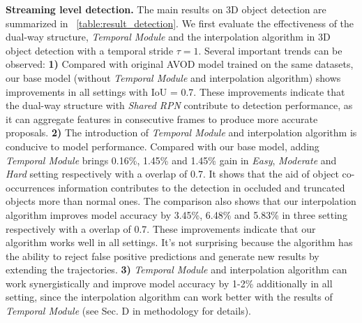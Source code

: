 \documentclass[letterpaper, 10pt, conference]{ieeeconf}  %
\begin{document}
\textbf{Streaming level detection.} The main results on 3D object detection are summarized in \tablename \, \ref{table:result_detection}. We first evaluate the effectiveness of the dual-way structure, \textit{Temporal Module} and the interpolation algorithm in 3D object detection with a temporal stride $\tau = 1$. Several important trends can be observed: \textbf{1)} Compared with original AVOD \cite{ku2018joint} model trained on the same datasets, our base model (without \textit{Temporal Module} and interpolation algorithm) shows improvements in all settings with IoU = 0.7. These improvements indicate that the dual-way structure with \textit{Shared RPN} contribute to detection performance, as it can aggregate features in consecutive frames to produce more accurate proposals. \textbf{2)} The introduction of \textit{Temporal Module} and interpolation algorithm is conducive to model performance. Compared with our base model, adding \textit{Temporal Module} brings 0.16\%, 1.45\% and 1.45\% gain in \textit{Easy}, \textit{Moderate} and \textit{Hard} setting respectively with a overlap of 0.7. It shows that the aid of object co-occurrences information contributes to the detection in occluded and truncated objects more than normal ones. The comparison also shows that our interpolation algorithm improves model accuracy by 3.45\%, 6.48\% and 5.83\% in three setting respectively with a overlap of 0.7. These improvements indicate that our algorithm works well in all settings. It's not surprising because the algorithm has the ability to reject false positive predictions and generate new results by extending the trajectories. \textbf{3)} \textit{Temporal Module} and interpolation algorithm can work synergistically and improve model accuracy by 1-2\% additionally in all setting, since the interpolation algorithm can work better with the results of \textit{Temporal Module} (see Sec. D in methodology for details). 
\end{document}
